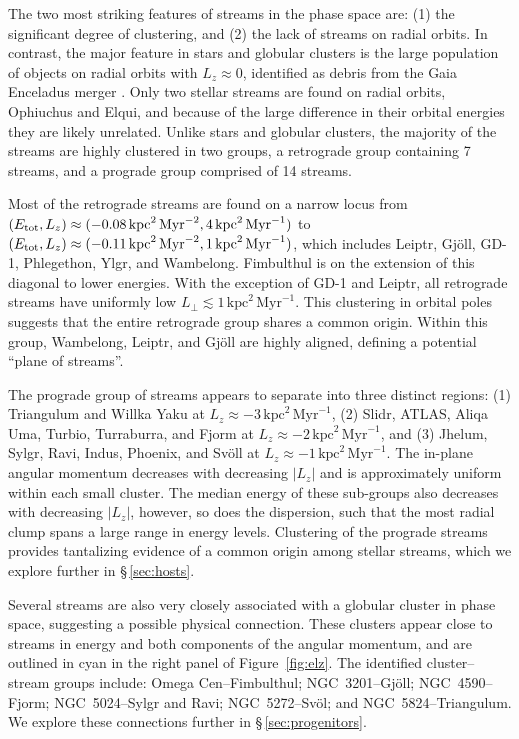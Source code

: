 \documentclass[twocolumn]{aastex63}
\newcommand{\ul}{\ensuremath{\textrm{kpc}^2\,\textrm{Myr}^{-1}}}
\newcommand{\ue}{\ensuremath{\textrm{kpc}^2\,\textrm{Myr}^{-2}}}
\begin{document}
The two most striking features of streams in the phase space are: (1) the significant degree of clustering, and (2) the lack of streams on radial orbits.
In contrast, the major feature in stars and globular clusters is the large population of objects on radial orbits with $L_z\approx0$, identified as debris from the Gaia Enceladus merger \citep[e.g.,][]{belokurov2018, helmi2018, naidu2020}.
Only two stellar streams are found on radial orbits, Ophiuchus and Elqui, and because of the large difference in their orbital energies they are likely unrelated.
Unlike stars and globular clusters, the majority of the streams are highly clustered in two groups, a retrograde group containing 7 streams, and a prograde group comprised of 14 streams.

Most of the retrograde streams are found on a narrow locus from $(E_{\rm tot}, L_z)\approx(-0.08\,\ue,\allowbreak 4\,\ul)$ to $(E_{\rm tot}, L_z)\approx(-0.11\,\ue,\allowbreak 1\,\ul)$, which includes Leiptr, Gj\" oll, GD-1, Phlegethon, Ylgr, and Wambelong.
Fimbulthul is on the extension of this diagonal to lower energies.
With the exception of GD-1 and Leiptr, all retrograde streams have uniformly low $L_\perp\lesssim1\,\ul$.
This clustering in orbital poles suggests that the entire retrograde group shares a common origin.
Within this group, Wambelong, Leiptr, and Gj\" oll are highly aligned, defining a potential ``plane of streams''.

The prograde group of streams appears to separate into three distinct regions: (1) Triangulum and Willka Yaku at $L_z\approx-3\,\ul$, (2) Slidr, ATLAS, Aliqa Uma, Turbio, Turraburra, and Fjorm at $L_z\approx-2\,\ul$, and (3) Jhelum, Sylgr, Ravi, Indus, Phoenix, and Sv\" oll at $L_z\approx-1\,\ul$.
The in-plane angular momentum decreases with decreasing $|L_z|$ and is approximately uniform within each small cluster.
The median energy of these sub-groups also decreases with decreasing $|L_z|$, however, so does the dispersion, such that the most radial clump spans a large range in energy levels.
Clustering of the prograde streams  provides tantalizing evidence of a common origin among stellar streams, which we explore further in \S\,\ref{sec:hosts}.

Several streams are also very closely associated with a globular cluster in phase space, suggesting a possible physical connection.
These clusters appear close to streams in energy and both components of the angular momentum, and are outlined in cyan in the right panel of Figure~\ref{fig:elz}.
The identified cluster--stream groups include: Omega Cen--Fimbulthul; NGC~3201--Gj\" oll; NGC~4590--Fjorm; NGC~5024--Sylgr and Ravi; NGC~5272--Sv\" ol; and NGC~5824--Triangulum.
We explore these connections further in \S\,\ref{sec:progenitors}.
\end{document}
